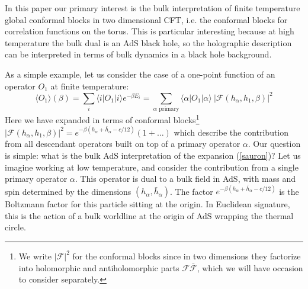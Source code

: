 \documentclass[12pt]{article}
\newcommand\rref[1]{(\ref{#1})}
\begin{document}
In this  paper our primary interest is the bulk interpretation of finite temperature global conformal blocks in two dimensional CFT, i.e. the conformal blocks for correlation functions on the torus.
This is particular interesting because at high temperature the bulk dual is an AdS black hole, so the holographic description can be interpreted in terms of bulk dynamics in a black hole background.

As a simple example, let us consider the case of a one-point function of an operator $O_1$ at finite temperature:
\begin{equation}\label{sauron}
\langle O_1 \rangle (\beta) = \sum_i \langle i | O_1 | i \rangle e^{-\beta E_i} = \sum_{\alpha \text{ primary}} \langle \alpha | O_1 | \alpha \rangle~
\left |\mathcal{F}(h_\alpha, h_1, \beta)\right|^2
\end{equation}
Here we have expanded in terms of conformal blocks\footnote{We write $|\mathcal{F}|^2$ for the conformal blocks since in two dimensions they factorize into holomorphic and antiholomorphic parts $\mathcal{F}\bar{\mathcal{F}}$, which we will have occasion to consider separately.}
$|\mathcal{F}(h_\alpha, h_1, \beta)|^2 =  e^{-\beta (h_\alpha+{\bar h}_\alpha - c/12)} \left(1 + \dots\right)$
which describe the contribution from all descendant operators built on top of a primary operator $\alpha$.  Our question is simple: what is the bulk AdS interpretation of the expansion \rref{sauron}? Let us imagine working at low temperature, and consider the contribution from a single primary operator $\alpha$.  This operator is dual to a bulk field in AdS, with mass and spin determined by the dimensions $(h_\alpha, {\bar h}_\alpha)$.  The factor $e^{-\beta (h_{\alpha} + {\bar h}_\alpha-c/12)}$ is the Boltzmann factor for this particle sitting at the origin.  In Euclidean signature, this is the action of a bulk worldline at the origin of AdS wrapping the thermal circle.
\end{document}
